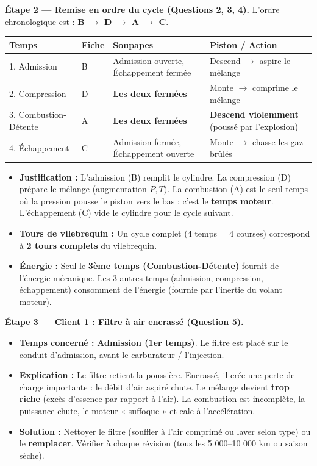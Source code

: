 \documentclass[11pt]{article}
\begin{document}
\textbf{Étape 2 — Remise en ordre du cycle (Questions 2, 3, 4).}
L'ordre chronologique est : \textbf{B $\rightarrow$ D $\rightarrow$ A $\rightarrow$ C}.
\begin{center}
\begin{tabularx}{\linewidth}{|l|X|X|X|}\hline
\textbf{Temps} & \textbf{Fiche} & \textbf{Soupapes} & \textbf{Piston / Action} \\ \hline
1. Admission & B & Admission ouverte, Échappement fermée & Descend $\rightarrow$ aspire le mélange \\ \hline
2. Compression & D & \textbf{Les deux fermées} & Monte $\rightarrow$ comprime le mélange \\ \hline
3. Combustion-Détente & A & \textbf{Les deux fermées} & \textbf{Descend violemment} (poussé par l'explosion) \\ \hline
4. Échappement & C & Admission fermée, Échappement ouverte & Monte $\rightarrow$ chasse les gaz brûlés \\ \hline
\end{tabularx}
\end{center}
\begin{itemize}
\item \textbf{Justification :} L'admission (B) remplit le cylindre. La compression (D) prépare le mélange (augmentation $P, T$). La combustion (A) est le seul temps où la pression pousse le piston vers le bas : c'est le \textbf{temps moteur}. L'échappement (C) vide le cylindre pour le cycle suivant.
\item \textbf{Tours de vilebrequin :} Un cycle complet (4 temps = 4 courses) correspond à \textbf{2 tours complets} du vilebrequin.
\item \textbf{Énergie :} Seul le \textbf{3ème temps (Combustion-Détente)} fournit de l'énergie mécanique. Les 3 autres temps (admission, compression, échappement) consomment de l'énergie (fournie par l'inertie du volant moteur).
\end{itemize}

\textbf{Étape 3 — Client 1 : Filtre à air encrassé (Question 5).}
\begin{itemize}
\item \textbf{Temps concerné :} \textbf{Admission (1er temps)}. Le filtre est placé sur le conduit d'admission, avant le carburateur / l'injection.
\item \textbf{Explication :} Le filtre retient la poussière. Encrassé, il crée une perte de charge importante : le débit d'air aspiré chute. Le mélange devient \textbf{trop riche} (excès d'essence par rapport à l'air). La combustion est incomplète, la puissance chute, le moteur « suffoque » et cale à l'accélération.
\item \textbf{Solution :} Nettoyer le filtre (souffler à l'air comprimé ou laver selon type) ou le \textbf{remplacer}. Vérifier à chaque révision (tous les 5 000--10 000 km ou saison sèche).
\end{itemize}
\end{document}
